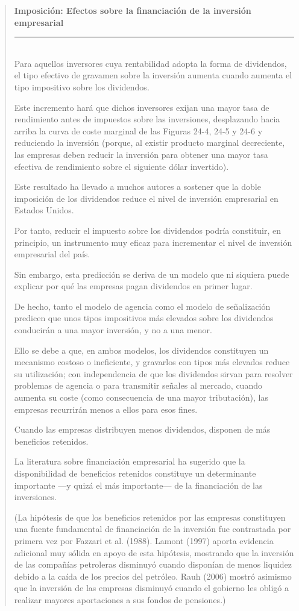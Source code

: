 \documentclass[10pt,a4paper]{article}
\newenvironment{specialblock}[1]{%
      \begin{quote} %
      \small %
      \noindent\textbf{#1}\\[-0.3em] %
      \rule{\linewidth}{0.4pt}\\[0.6em]}{
      \end{quote}}
\begin{document}
\begin{specialblock}{Imposición: Efectos sobre la financiación de la inversión empresarial}
    Para aquellos inversores cuya rentabilidad adopta la forma de dividendos, el tipo efectivo de gravamen sobre la inversión aumenta cuando aumenta el tipo impositivo sobre los dividendos.
    
    Este incremento hará que dichos inversores exijan una mayor tasa de rendimiento antes de impuestos sobre las inversiones, desplazando hacia arriba la curva de coste marginal de las Figuras 24-4, 24-5 y 24-6 y reduciendo la inversión (porque, al existir producto marginal decreciente, las empresas deben reducir la inversión para obtener una mayor tasa efectiva de rendimiento sobre el siguiente dólar invertido).
    
    Este resultado ha llevado a muchos autores a sostener que la doble imposición de los dividendos reduce el nivel de inversión empresarial en Estados Unidos.
    
    Por tanto, reducir el impuesto sobre los dividendos podría constituir, en principio, un instrumento muy eficaz para incrementar el nivel de inversión empresarial del país.
    
    Sin embargo, esta predicción se deriva de un modelo que ni siquiera puede explicar por qué las empresas pagan dividendos en primer lugar.
    
    De hecho, tanto el modelo de agencia como el modelo de señalización predicen que unos tipos impositivos más elevados sobre los dividendos conducirán a una mayor inversión, y no a una menor.
    
    Ello se debe a que, en ambos modelos, los dividendos constituyen un mecanismo costoso o ineficiente, y gravarlos con tipos más elevados reduce su utilización; con independencia de que los dividendos sirvan para resolver problemas de agencia o para transmitir señales al mercado, cuando aumenta su coste (como consecuencia de una mayor tributación), las empresas recurrirán menos a ellos para esos fines.
    
    Cuando las empresas distribuyen menos dividendos, disponen de más beneficios retenidos.
    
    La literatura sobre financiación empresarial ha sugerido que la disponibilidad de beneficios retenidos constituye un determinante importante —y quizá el más importante— de la financiación de las inversiones.
    
    (La hipótesis de que los beneficios retenidos por las empresas constituyen una fuente fundamental de financiación de la inversión fue contrastada por primera vez por Fazzari et al. (1988). Lamont (1997) aporta evidencia adicional muy sólida en apoyo de esta hipótesis, mostrando que la inversión de las compañías petroleras disminuyó cuando disponían de menos liquidez debido a la caída de los precios del petróleo. Rauh (2006) mostró asimismo que la inversión de las empresas disminuyó cuando el gobierno les obligó a realizar mayores aportaciones a sus fondos de pensiones.)
    

\end{specialblock}
\end{document}
